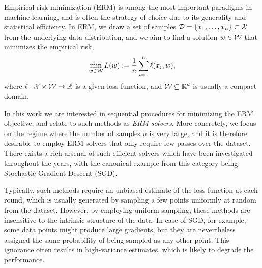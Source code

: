Empirical risk minimization (ERM) is among the most important paradigms in machine learning, and  is often the strategy of choice due to its generality and statistical efficiency.
In ERM, we draw a set of  samples ${\mathcal{D}}=\{x_1,\ldots,x_n\}\subset \mathcal{X}$ from the underlying data distribution, and we aim to find a solution $w\in\mathcal{W}$ that minimizes the empirical risk,  %
\begin{equation} \label{eq:ERM}
  \min_{w\in\mathcal{W} }L(w) := \frac{1}{n}  \sum_{i=1}^n \ell (x_i, w),
\end{equation}
where $\ell: \mathcal{X} \times \mathcal{W} \rightarrow {\mathbb R}$ is a given loss function, and $\mathcal{W}\subseteq {\mathbb R}^d$ is usually a compact domain.

In this work we are interested in sequential procedures for minimizing the ERM objective, and relate to such methods as \emph{ERM solvers}.
More concretely, we focus on the regime where the number of samples $n$ is very large,  and it is therefore desirable to employ ERM solvers that only require  few passes over the dataset. There exists a rich arsenal of such efficient solvers which have been investigated throughout the years, with the canonical example from this category being  Stochastic Gradient Descent (SGD).


%
%

Typically, such methods  require an unbiased estimate of the loss function at each round, which is usually  generated   by sampling a few points uniformly at random from the dataset.
However, by employing uniform sampling, these methods are insensitive to the intrinsic structure of the data. In case of SGD, for example, some data points might produce large gradients, but they are nevertheless assigned the same probability of being sampled as any other point. This ignorance often results in high-variance estimates, which is likely to degrade the performance.

